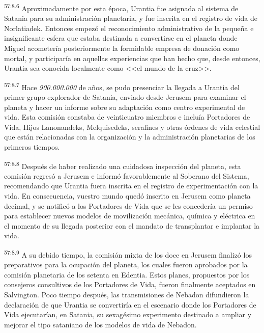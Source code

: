 \par
\textsuperscript{57:8.6} Aproximadamente por esta época, Urantia fue asignada al sistema de Satania para su administración planetaria, y fue inscrita en el registro de vida de Norlatiadek. Entonces empezó el reconocimiento administrativo de la pequeña e insignificante esfera que estaba destinada a convertirse en el planeta donde Miguel acometería posteriormente la formidable empresa de donación como mortal, y participaría en aquellas experiencias que han hecho que, desde entonces, Urantia sea conocida localmente como <<el mundo de la cruz>>.

\par
\textsuperscript{57:8.7} Hace \textit{900.000.000} de años, se pudo presenciar la llegada a Urantia del primer grupo explorador de Satania, enviado desde Jerusem para examinar el planeta y hacer un informe sobre su adaptación como centro experimental de vida. Esta comisión constaba de veinticuatro miembros e incluía Portadores de Vida, Hijos Lanonandeks, Melquisedeks, serafines y otras órdenes de vida celestial que están relacionadas con la organización y la administración planetarias de los primeros tiempos.

\par
\textsuperscript{57:8.8} Después de haber realizado una cuidadosa inspección del planeta, esta comisión regresó a Jerusem e informó favorablemente al Soberano del Sistema, recomendando que Urantia fuera inscrita en el registro de experimentación con la vida. En consecuencia, vuestro mundo quedó inscrito en Jerusem como planeta decimal, y se notificó a los Portadores de Vida que se les concedería un permiso para establecer nuevos modelos de movilización mecánica, química y eléctrica en el momento de su llegada posterior con el mandato de transplantar e implantar la vida.

\par
\textsuperscript{57:8.9} A su debido tiempo, la comisión mixta de los doce en Jerusem finalizó los preparativos para la ocupación del planeta, los cuales fueron aprobados por la comisión planetaria de los setenta en Edentia. Estos planes, propuestos por los consejeros consultivos de los Portadores de Vida, fueron finalmente aceptados en Salvington. Poco tiempo después, las transmisiones de Nebadon difundieron la declaración de que Urantia se convertiría en el escenario donde los Portadores de Vida ejecutarían, en Satania, su sexagésimo experimento destinado a ampliar y mejorar el tipo sataniano de los modelos de vida de Nebadon.

